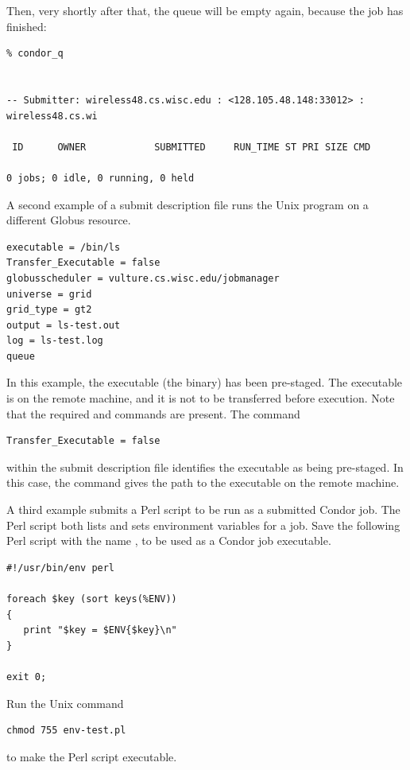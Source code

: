 Then, very shortly after that, the queue will be empty again,
because the job has finished:

\footnotesize
\begin{verbatim}
% condor_q


-- Submitter: wireless48.cs.wisc.edu : <128.105.48.148:33012> : wireless48.cs.wi

 ID      OWNER            SUBMITTED     RUN_TIME ST PRI SIZE CMD

0 jobs; 0 idle, 0 running, 0 held
\end{verbatim}
\normalsize


A second example of a submit description file runs the Unix 
program on a different Globus resource.

\footnotesize
\begin{verbatim}
executable = /bin/ls
Transfer_Executable = false
globusscheduler = vulture.cs.wisc.edu/jobmanager
universe = grid
grid_type = gt2
output = ls-test.out
log = ls-test.log
queue
\end{verbatim} 
\normalsize

In this example, the executable (the binary) has been pre-staged.
The executable is on the remote machine, and it is not to
be transferred before execution.
Note that the required 
 and 
commands are present.
The command
\begin{verbatim}
Transfer_Executable = false
\end{verbatim}
within the submit description file identifies the executable
as being pre-staged.
In this case, the 
command gives the path to the executable on the remote machine.

A third example submits a Perl script to be run as a submitted
Condor job.
The Perl script both lists and sets
environment variables for a job.
Save the following Perl script with the name ,
to be used as a Condor job executable.

\begin{verbatim}
#!/usr/bin/env perl

foreach $key (sort keys(%ENV))
{
   print "$key = $ENV{$key}\n"
}

exit 0;
\end{verbatim}

Run the Unix command
\begin{verbatim}
chmod 755 env-test.pl
\end{verbatim}
to make the Perl script executable.

